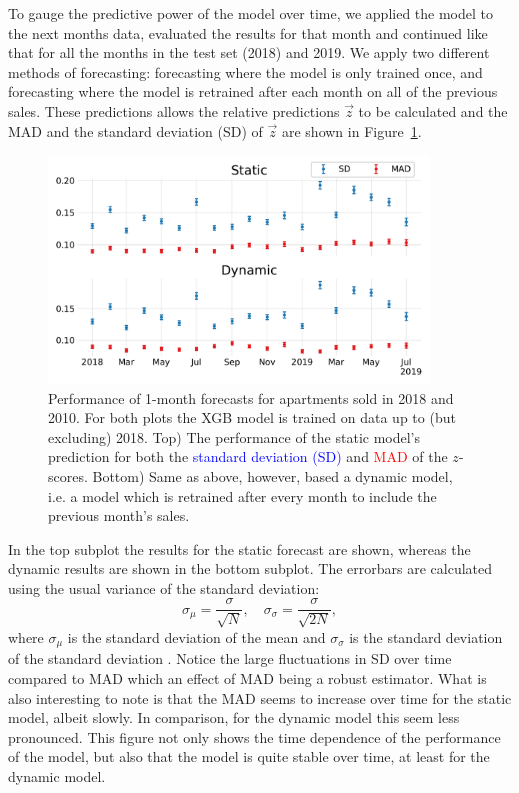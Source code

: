 To gauge the predictive power of the model over time, we applied the model to the next months data, evaluated the results for that month and continued like that for all the months in the test set (\num{2018}) and \num{2019}. We apply two different methods of forecasting:  forecasting where the model is only trained once, and  forecasting where the model is retrained after each month on all of the previous sales. These predictions allows the relative predictions $\vec{z}$ to be calculated and the MAD and the standard deviation (SD) of $\vec{z}$ are shown in Figure~\ref{fig:h:forecast_MAD_SD}. 
\begin{figure}
  \includegraphics[width=0.9\textwidth, trim=0 0 0 0, clip]{figures/housing/Ejerlejlighed_v19_cut_all_Ncols_all_xgb_forecast_prediction_MAD.pdf}
  \caption[2018 XGB Forecast]
          {Performance of 1-month forecasts for apartments sold in \num{2018} and \num{2010}. For both plots the XGB model is trained on data up to (but excluding) 2018. Top) The performance of the static model's prediction for both the \textcolor{blue}{standard deviation (SD)} and \textcolor{red}{MAD} of the $z$-scores. Bottom) Same as above, however, based a dynamic model, i.e. a model which is retrained after every month to include the previous month's sales.} 
  \label{fig:h:forecast_MAD_SD}
\end{figure}

In the top subplot the results for the static forecast are shown, whereas the dynamic results are shown in the bottom subplot. The errorbars are calculated using the usual variance of the standard deviation:
\begin{equation}
  \sigma_\mu  = \frac{\sigma}{\sqrt{N}}, \quad \sigma_\sigma = \frac{\sigma}{\sqrt{2N}},
\end{equation}
where $\sigma_\mu$ is the standard deviation of the mean and $\sigma_\sigma$ is the standard deviation of the standard deviation \autocite{Barlow:0471922951}.
Notice the large fluctuations in SD over time compared to MAD which an effect of MAD being a robust estimator. What is also interesting to note is that the MAD seems to increase over time for the static model, albeit slowly. In comparison, for the dynamic model this seem less pronounced. This figure not only shows the time dependence of the performance of the model, but also that the model is quite stable over time, at least for the dynamic model. 

